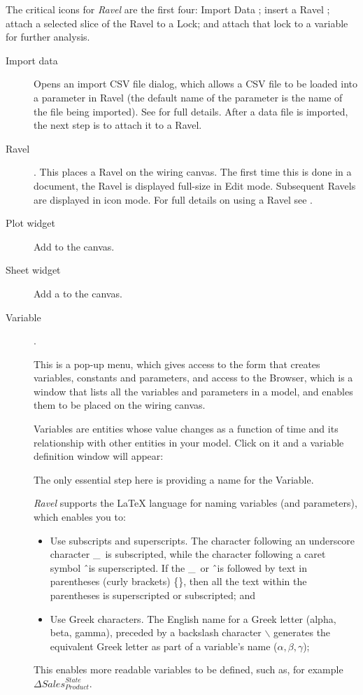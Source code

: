 The critical icons for \emph{Ravel} are the first four: Import Data
; insert a Ravel ;
attach a selected slice of the Ravel to a Lock; and attach that lock
to a variable for further analysis.
\begin{description}
\item [{Import data}]  Opens an import CSV
file dialog, which allows a CSV file to be loaded into a parameter
in Ravel (the default name of the parameter is the name of the file
being imported). See 
for full details. After a data file is imported, the next step is
to attach it to a Ravel.
\item [{Ravel}] . This places a Ravel on the
wiring canvas. The first time this is done in a document, the Ravel
is displayed full-size in Edit mode. Subsequent Ravels are displayed
in icon mode. For full details on using a Ravel see .
\item [{Plot widget}]  Add 
to the canvas.
\item [{Sheet widget}]  Add a 
to the canvas.
\item [{Variable}] . \label{Variable}

This is a pop-up menu, which gives access to the form that creates
variables, constants and parameters, and access to the Browser, which
is a window that lists all the variables and parameters in a model,
and enables them to be placed on the wiring canvas.

Variables are entities whose value changes as a function of time and
its relationship with other entities in your model. Click on it and
a variable definition window will appear:
\begin{center}
\par\end{center}

The only essential step here is providing a name for the Variable.

\emph{Ravel} supports the LaTeX language for naming variables (and
parameters), which enables you to:
\begin{itemize}
\item Use subscripts and superscripts. The character following an underscore
character \_\ is subscripted, while the character following a caret
symbol \^{\ }is superscripted. If the \_\ or \^{\ }is followed
by text in parentheses (curly brackets) \{\}, then all the text within
the parentheses is superscripted or subscripted; and 
\item Use Greek characters. The English name for a Greek letter (alpha,
beta, gamma), preceded by a backslash character $\backslash$ generates
the equivalent Greek letter as part of a variable's name ($\alpha,\beta,\gamma$);
\end{itemize}
This enables more readable variables to be defined, such as, for example
$\Delta{Sales}_{Product}^{State}$.


\end{description}
